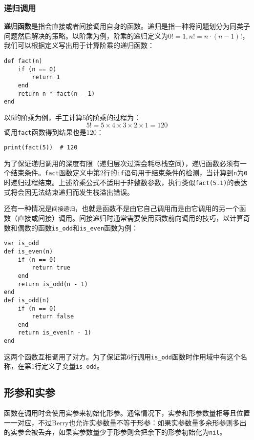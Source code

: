 \subsubsection{递归调用}

\textbf{递归函数}是指会直接或者间接调用自身的函数。递归是指一种将问题划分为同类子问题然后解决的策略。以阶乘为例，阶乘的递归定义为$0!=1, n!=n\cdot(n-1)!$，我们可以根据定义写出用于计算阶乘的递归函数：
\begin{lstlisting}[language=berry]
def fact(n)
    if (n == 0)
        return 1
    end
    return n * fact(n - 1)
end
\end{lstlisting}
以$5$的阶乘为例，手工计算5的阶乘的过程为：
\begin{equation*}
5! = 5 \times 4 \times 3 \times 2 \times 1 = 120
\end{equation*}
调用\texttt{fact}函数得到结果也是$120$：
\begin{lstlisting}[language=berry, numbers=none]
print(fact(5))  # 120
\end{lstlisting}

为了保证递归调用的深度有限（递归层次过深会耗尽栈空间），递归函数必须有一个结束条件。\texttt{fact}函数定义中第2行的\texttt{if}语句用于结束条件的检测，当计算到\texttt{n}为\texttt{0}时递归过程结束。上述阶乘公式不适用于非整数参数，执行类似\texttt{fact(5.1)}的表达式将会因无法结束递归而发生栈溢出错误。

还有一种情况是\texttt{间接递归}，也就是函数不是由它自己调用而是由它调用的另一个函数（直接或间接）调用。间接递归时通常需要使用函数前向调用的技巧，以计算奇数和偶数的函数\texttt{is\_odd}和\texttt{is\_even}函数为例：
\begin{lstlisting}[language=berry]
var is_odd
def is_even(n)
    if (n == 0)
        return true
    end
    return is_odd(n - 1) 
end
def is_odd(n)
    if (n == 0)
        return false
    end
    return is_even(n - 1) 
end
\end{lstlisting}
这两个函数互相调用了对方。为了保证第6行调用\texttt{is\_odd}函数时作用域中有这个名称，在第1行定义了变量\texttt{is\_odd}。

\subsection{形参和实参}

函数在调用时会使用实参来初始化形参。通常情况下，实参和形参数量相等且位置一一对应，不过Berry也允许实参数量不等于形参：如果实参数量多余形参则多出的实参会被丢弃，如果实参数量少于形参则会把余下的形参初始化为\texttt{nil}。

